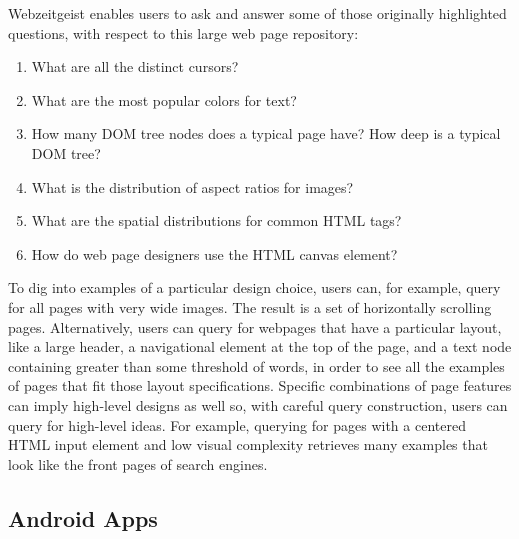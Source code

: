 Webzeitgeist enables users to ask and answer some of those originally highlighted questions, with respect to this large web page repository:
\begin{enumerate}
\item    What are all the distinct cursors?
\item    What are the most popular colors for text?
\item    How many DOM tree nodes does a typical page have? How deep is a typical DOM tree?
\item    What is the distribution of aspect ratios for images?
\item    What are the spatial distributions for common HTML tags?
\item    How do web page designers use the HTML canvas element?
\end{enumerate}

To dig into examples of a particular design choice, users can, for example, query for all pages with very wide images. The result is a set of horizontally scrolling pages. Alternatively, users can query for webpages that have a particular layout, like a large header, a navigational element at the top of the page, and a text node containing greater than some threshold of words, in order to see all the examples of pages that fit those layout specifications. Specific combinations of page features can imply high-level designs as well so, with careful query construction, users can query for high-level ideas. For example, querying for pages with a centered HTML input element and low visual complexity retrieves many examples that look like the front pages of search engines.

\subsection{Android Apps}

